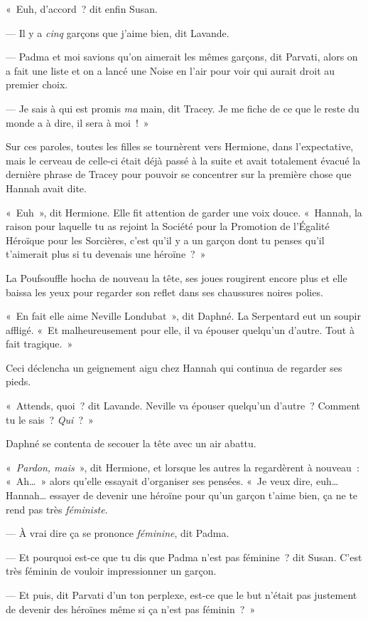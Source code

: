 «~Euh, d'accord~? dit enfin Susan.

--- Il y a \emph{cinq} garçons que j'aime bien, dit Lavande.

--- Padma et moi savions qu'on aimerait les mêmes garçons, dit Parvati, alors on a fait une liste et on a lancé une Noise en l'air pour voir qui aurait droit au premier choix.

--- Je sais à qui est promis \emph{ma} main, dit Tracey.
Je me fiche de ce que le reste du monde a à dire, il sera à moi~!~»

Sur ces paroles, toutes les filles se tournèrent vers Hermione, dans l'expectative, mais le cerveau de celle-ci était déjà passé à la suite et avait totalement évacué la dernière phrase de Tracey pour pouvoir se concentrer sur la première chose que Hannah avait dite.

«~Euh~», dit Hermione.
Elle fit attention de garder une voix douce.
«~Hannah, la raison pour laquelle tu as rejoint la Société pour la Promotion de l'Égalité Héroïque pour les Sorcières, c'est qu'il y a un garçon dont tu penses qu'il t'aimerait plus si tu devenais une héroïne~?~»

La Poufsouffle hocha de nouveau la tête, ses joues rougirent encore plus et elle baissa les yeux pour regarder son reflet dans ses chaussures noires polies.

«~En fait elle aime Neville Londubat~», dit Daphné.
La Serpentard eut un soupir affligé.
«~Et malheureusement pour elle, il va épouser quelqu'un d'autre.
Tout à fait tragique.~»

Ceci déclencha un geignement aigu chez Hannah qui continua de regarder ses pieds.

«~Attends, quoi~? dit Lavande.
Neville va épouser quelqu'un d'autre~?
Comment tu le sais~?
\emph{Qui}~?~»

Daphné se contenta de secouer la tête avec un air abattu.

«~\emph{Pardon, mais}~», dit Hermione, et lorsque les autres la regardèrent à nouveau~: «~Ah…~»
alors qu'elle essayait d'organiser ses pensées.
«~Je veux dire, euh…
Hannah… essayer de devenir une héroïne pour qu'un garçon t'aime bien, ça ne te rend pas très \emph{féministe}.

--- À vrai dire ça se prononce \emph{féminine}, dit Padma.

--- Et pourquoi est-ce que tu dis que Padma n'est pas féminine~? dit Susan.
C'est très féminin de vouloir impressionner un garçon.

--- Et puis, dit Parvati d'un ton perplexe, est-ce que le but n'était pas justement de devenir des héroïnes même si ça n'est pas féminin~?~»

